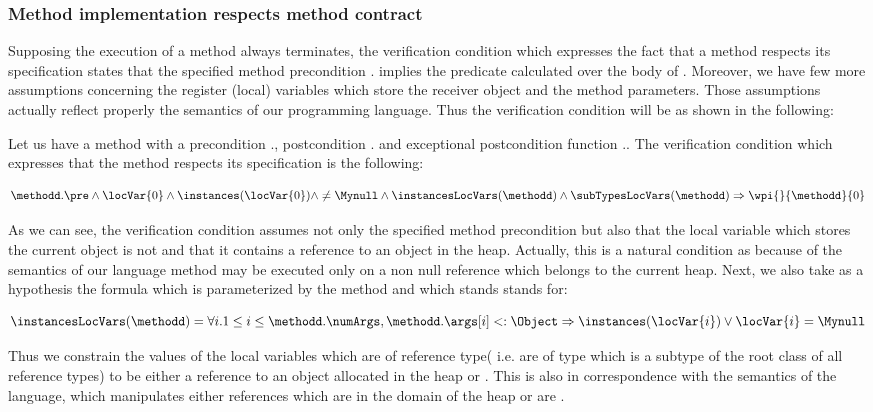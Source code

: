 \subsubsection{Method implementation respects method contract}
Supposing the execution of a method always terminates, the verification condition which expresses the fact that 
 a method \methodd{}  respects its specification 
states that the specified method precondition  \methodd.\pre{} implies the
 predicate   calculated over the body of
 \methodd{}. Moreover,  we have few more assumptions concerning the register (local) variables
 which store the receiver object and the method parameters. Those assumptions
 actually reflect properly the semantics of our programming language. Thus the
 verification condition  will be as shown in the following: %
\begin{thmVC}\label{wp:vc:impl} Let us have a method \methodd{}
 with a precondition \methodd.\pre{}, postcondition
  \methodd.\normalPost{} and exceptional postcondition function   \methodd.\excPostSpec{}. The verification condition which expresses that the method respects its
 specification is the following:

 $$ \methodd.\pre  \wedge \locVar{0} \wedge \instances( \locVar{0} ) \wedge
\neq \Mynull   
\wedge \instancesLocVars(\methodd )  \wedge \subTypesLocVars(\methodd )   \Rightarrow
 \wpi{}{\methodd}{0} $$
\end{thmVC}
As we can see, the verification condition assumes not only the specified
 method precondition but also  that the local variable
 which stores the current object is not \Mynull{} and that it
 contains a reference to an object in the heap. Actually, this is
 a natural condition as because of the semantics of our language
 method may be executed only on a non null reference which belongs to the
 current heap. Next, we also take as  a hypothesis the formula  \instancesLocVars{} which is
parameterized by the method \methodd{} and   which stands stands for:

$$ \instancesLocVars(\methodd  )  =  \forall i.
 1 \le i \le \methodd.\numArgs,  \methodd. \args[i] <: \Object \Rightarrow  \instances( \locVar{i} )
  \vee \locVar{i} = \Mynull
$$

Thus we constrain the values of the local variables which are of reference
type( i.e. are of type which is a subtype  of the root class \Object{} of all
reference types) to be either a reference to an object allocated in the
heap or \Mynull. This is also in correspondence with the semantics of the
language, which manipulates either references which are in the domain
of the heap or are \Mynull.

